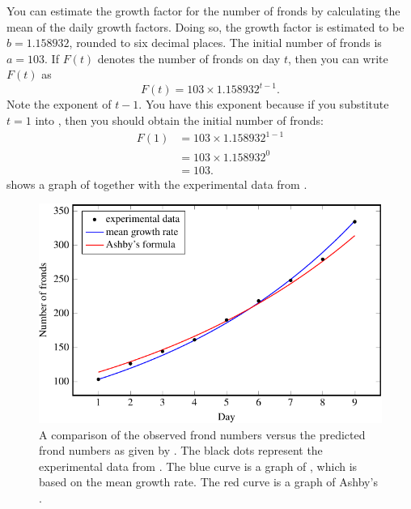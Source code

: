 \documentclass[a4paper,oneside,12pt]{article}
\begin{document}
\begin{problem}
{\begin{solution}
You can estimate the growth factor for the number of fronds by
calculating the mean of the daily growth factors.  Doing so, the
growth factor is estimated to be $b = 1.158932$, rounded to six
decimal places.  The initial number of fronds is $a = 103$.  If $F(t)$
denotes the number of fronds on day $t$, then you can write $F(t)$ as
\begin{equation}
\label{eqn:exponential:fronds_formula_average_growth_factor}
F(t)
=
103 \times 1.158932^{t - 1}.
\end{equation}
Note the exponent of $t - 1$.  You have this exponent because if you
substitute $t = 1$ into
, then
you should obtain the initial number of fronds:
\begin{align*}
F(1)
&=
103 \times 1.158932^{1 - 1} \\[4pt]
&=
103 \times 1.158932^0 \\[4pt]
&=
103.
\end{align*}
 shows a graph of
together with the experimental data from
.

\begin{figure}[!htbp]
\centering
\includegraphics[scale=1.1]{image/11/frond12-estimated-b.pdf}
\caption{%
  A comparison of the observed frond numbers versus the predicted
  frond numbers as given by
  .
  The black dots represent the experimental data from
  .  The blue curve is
  a graph of
  ,
  which is based on the mean growth rate.  The red curve is a graph of
  Ashby's .
}
\label{fig:exponential:frond12_theory_data}
\end{figure}


\end{solution}}
\end{problem}
\end{document}

